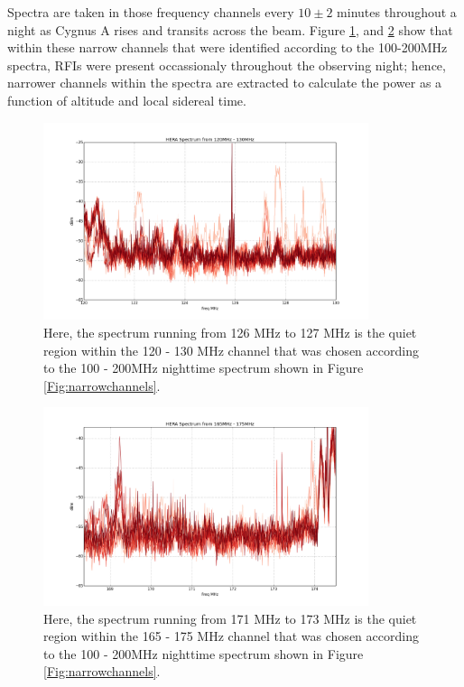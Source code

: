 \documentclass[preprint]{aastex}  %
\begin{document}
Spectra are taken in those frequency channels every $10\pm2$ minutes throughout a night as Cygnus A rises and transits across the beam. Figure \ref{Fig:120130allnight}, and \ref{Fig:165175allnight} show that within these narrow channels that were identified according to the 100-200MHz spectra, RFIs were present occassionaly throughout the observing night; hence, narrower channels within the spectra are extracted to calculate the power as a function of altitude and local sidereal time.

\begin{figure}[H]
	\begin{center}
	\includegraphics[width =0.85\textwidth]{spectra_plots/120130allnight}
	\caption{Here, the spectrum running from 126 MHz to 127 MHz is the quiet region within the 120 - 130 MHz channel that was chosen according to the 100 - 200MHz nighttime spectrum shown in Figure \ref{Fig:narrowchannels}.
\label{Fig:120130allnight} }
	\end{center}
\end{figure}
\clearpage

\begin{figure}[H]
	\begin{center}
	\includegraphics[width =0.85\textwidth]{spectra_plots/clean171173}
	\caption{Here, the spectrum running from 171 MHz to 173 MHz is the quiet region within the 165 - 175 MHz channel that was chosen according to the 100 - 200MHz nighttime spectrum shown in Figure \ref{Fig:narrowchannels}.
\label{Fig:165175allnight} }
	\end{center}
\end{figure}
\end{document}
